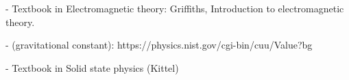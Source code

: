 %


- Textbook in Electromagnetic theory: Griffiths, Introduction to electromagnetic theory.

- (gravitational constant): https://physics.nist.gov/cgi-bin/cuu/Value?bg 

- Textbook in Solid state physics (Kittel)